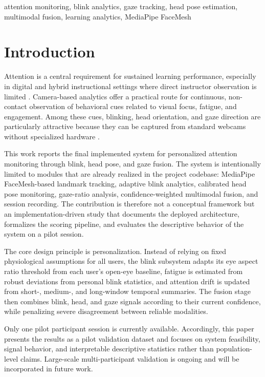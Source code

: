 \documentclass[conference]{IEEEtran}
\begin{document}
\begin{IEEEkeywords}
attention monitoring, blink analytics, gaze tracking, head pose estimation, multimodal fusion, learning analytics, MediaPipe FaceMesh
\end{IEEEkeywords}

\section{Introduction}
Attention is a central requirement for sustained learning performance, especially in digital and hybrid instructional settings where direct instructor observation is limited \cite{baker2014,blikstein2013,whitehill2014}. Camera-based analytics offer a practical route for continuous, non-contact observation of behavioral cues related to visual focus, fatigue, and engagement. Among these cues, blinking, head orientation, and gaze direction are particularly attractive because they can be captured from standard webcams without specialized hardware \cite{soukupova2016,murphy2009,hansen2010}.

This work reports the final implemented system for personalized attention monitoring through blink, head pose, and gaze fusion. The system is intentionally limited to modules that are already realized in the project codebase: MediaPipe FaceMesh-based landmark tracking, adaptive blink analytics, calibrated head pose monitoring, gaze-ratio analysis, confidence-weighted multimodal fusion, and session recording. The contribution is therefore not a conceptual framework but an implementation-driven study that documents the deployed architecture, formalizes the scoring pipeline, and evaluates the descriptive behavior of the system on a pilot session.

The core design principle is personalization. Instead of relying on fixed physiological assumptions for all users, the blink subsystem adapts its eye aspect ratio threshold from each user’s open-eye baseline, fatigue is estimated from robust deviations from personal blink statistics, and attention drift is updated from short-, medium-, and long-window temporal summaries. The fusion stage then combines blink, head, and gaze signals according to their current confidence, while penalizing severe disagreement between reliable modalities.

Only one pilot participant session is currently available. Accordingly, this paper presents the results as a pilot validation dataset and focuses on system feasibility, signal behavior, and interpretable descriptive statistics rather than population-level claims. Large-scale multi-participant validation is ongoing and will be incorporated in future work.
\end{document}
